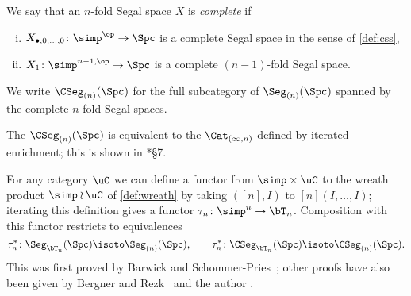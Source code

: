 \documentclass[a4paper,12pt]{article}
\begin{document}
\begin{defn}
  We say that an $n$-fold Segal space $X$ is \emph{complete} if
  \begin{enumerate}[(i)]
  \item $X_{\bullet,0,\dots,0} \colon \simp^{\op} \to \Spc$ is a
    complete Segal space in the sense of \cref{def:css},
  \item $X_{1} \colon \simp^{n-1,\op} \to \Spc$ is a complete
    $(n-1)$-fold Segal space.
  \end{enumerate}
  We write $\CSeg_{(n)}(\Spc)$ for the full subcategory of
  $\Seg_{(n)}(\Spc)$ spanned by the complete $n$-fold Segal spaces.
\end{defn}

\begin{remark}
  The \icat{} $\CSeg_{(n)}(\Spc)$ is equivalent to the \icat{}
  $\Cat_{(\infty,n)}$ defined by iterated enrichment; this is shown in
  \cite{enrcomp}*{\S 7}.
\end{remark}

\begin{remark}
  For any category $\uC$ we can define a functor from $\simp \times
  \uC$ to the wreath product $\simp \wr \uC$ of \cref{def:wreath} by
  taking $([n], I)$ to $[n](I,\dots,I)$; iterating this definition
  gives a functor $\tau_{n} \colon \simp^{n} \to \bT_{n}$. Composition
  with this functor restricts to equivalences
  \[ \tau_{n}^{*} \colon \Seg_{\bT_{n}}(\Spc) \isoto \Seg_{(n)}(\Spc),
    \qquad \tau_{n}^{*} \colon \CSeg_{\bT_{n}}(\Spc) \isoto
    \CSeg_{(n)}(\Spc).\]
  This was first proved by Barwick and
  Schommer-Pries~\cite{BSP}; other proofs have also been given by
  Bergner and Rezk~\cite{BergnerRezk} and the author \cite{thetan}.
\end{remark}
\end{document}
